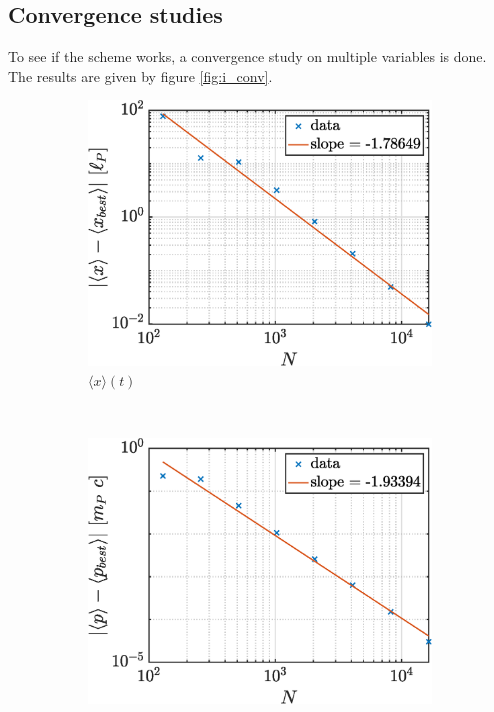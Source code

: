 \documentclass[a4paper,12pt,twoside]{article}
\begin{document}
  \subsection{Convergence studies}
    To see if the scheme works, a convergence study on multiple variables is done.
    The results are given by figure \ref{fig:i_conv}.

    \begin{figure}[h]
      \centering
      \begin{subfigure}{0.45\textwidth}
        \includegraphics[width=\textwidth]{graphs/i_conv_x.eps}
        \caption{$\langle x \rangle (t)$}
        \label{fig:i_conv_x}
      \end{subfigure}
      ~
      \begin{subfigure}{0.45\textwidth}
        \includegraphics[width=\textwidth]{graphs/i_conv_p.eps}

\end{subfigure}
\end{figure}
\end{document}
